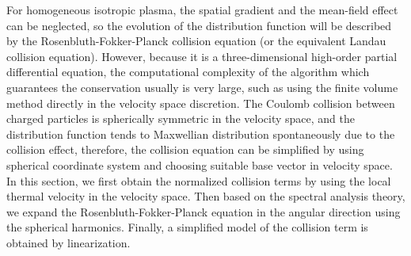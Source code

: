 \begin{abstract*}
For homogeneous isotropic plasma, the spatial gradient and the mean-field effect can be neglected, so the evolution of the distribution function will be described by the Rosenbluth-Fokker-Planck collision equation (or the equivalent Landau collision equation). However, because it is a three-dimensional high-order partial differential equation, the computational complexity of the algorithm which guarantees the conservation usually is very large, such as using the finite volume method directly in the velocity space discretion. The Coulomb collision between charged particles is spherically symmetric in the velocity space, and the distribution function tends to Maxwellian distribution spontaneously due to the collision effect, therefore, the collision equation can be simplified by using spherical coordinate system and choosing suitable base vector in velocity space. In this section, we first obtain the normalized collision terms by using the local thermal velocity in the velocity space. Then based on the spectral analysis theory, we expand the Rosenbluth-Fokker-Planck equation in the angular direction using the spherical harmonics. Finally, a simplified model of the collision term is obtained by linearization.


\end{abstract*}
